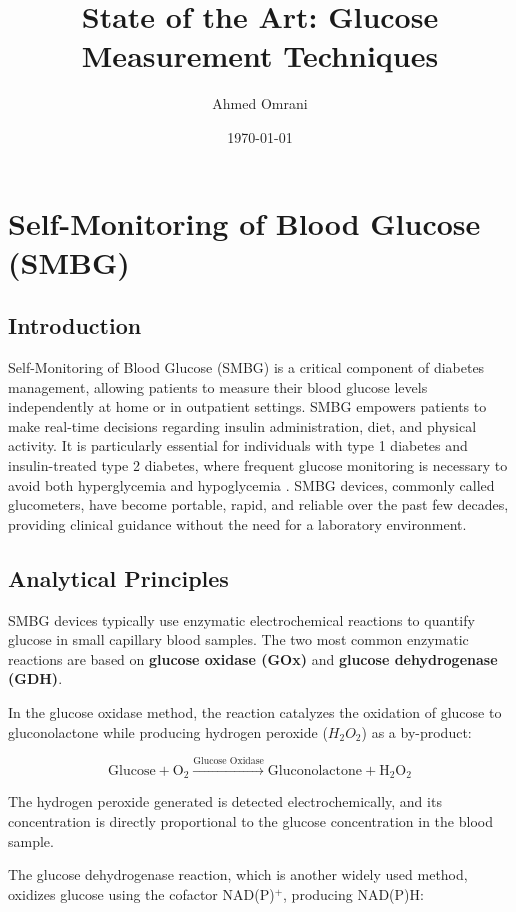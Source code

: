 \documentclass[12pt,a4paper]{article}  %
\title{State of the Art: Glucose Measurement Techniques}
\author{Ahmed Omrani}
\date{\today}
\begin{document}
\maketitle

\tableofcontents
\newpage
\section{Self-Monitoring of Blood Glucose (SMBG)}

\subsection{Introduction}
Self-Monitoring of Blood Glucose (SMBG) is a critical component of diabetes management, allowing patients to measure their blood glucose levels independently at home or in outpatient settings. SMBG empowers patients to make real-time decisions regarding insulin administration, diet, and physical activity. It is particularly essential for individuals with type 1 diabetes and insulin-treated type 2 diabetes, where frequent glucose monitoring is necessary to avoid both hyperglycemia and hypoglycemia \cite{Bergenstal2017, ADA2025}. SMBG devices, commonly called glucometers, have become portable, rapid, and reliable over the past few decades, providing clinical guidance without the need for a laboratory environment.

\subsection{Analytical Principles}
SMBG devices typically use enzymatic electrochemical reactions to quantify glucose in small capillary blood samples. The two most common enzymatic reactions are based on \textbf{glucose oxidase (GOx)} and \textbf{glucose dehydrogenase (GDH)}. 

In the glucose oxidase method, the reaction catalyzes the oxidation of glucose to gluconolactone while producing hydrogen peroxide (\(H_2O_2\)) as a by-product:

\[
\text{Glucose} + \text{O}_2 \xrightarrow{\text{Glucose Oxidase}} \text{Gluconolactone} + \text{H}_2\text{O}_2
\]

The hydrogen peroxide generated is detected electrochemically, and its concentration is directly proportional to the glucose concentration in the blood sample.  

The glucose dehydrogenase reaction, which is another widely used method, oxidizes glucose using the cofactor NAD(P)\(^+\), producing NAD(P)H:
\end{document}
